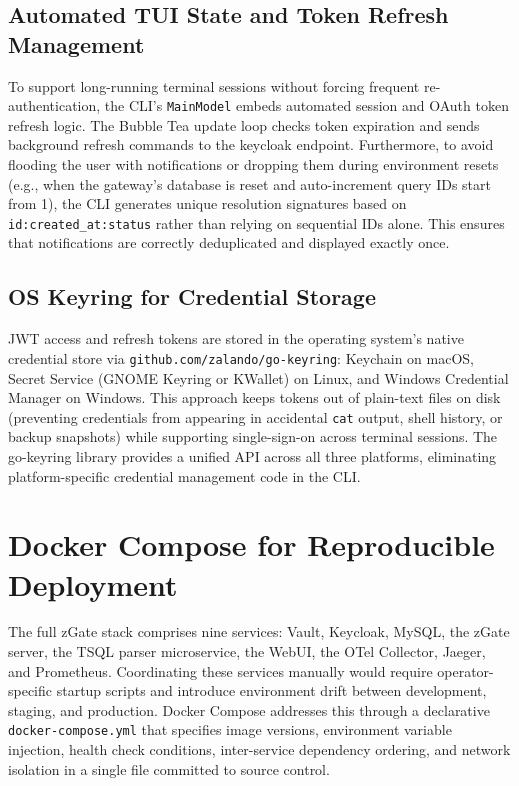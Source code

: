 \subsection{Automated TUI State and Token Refresh Management}

To support long-running terminal sessions without forcing frequent re-authentication, the CLI's \texttt{MainModel} embeds automated session and OAuth token refresh logic. The Bubble Tea update loop checks token expiration and sends background refresh commands to the keycloak endpoint. Furthermore, to avoid flooding the user with notifications or dropping them during environment resets (e.g., when the gateway's database is reset and auto-increment query IDs start from 1), the CLI generates unique resolution signatures based on \texttt{id:created\_at:status} rather than relying on sequential IDs alone. This ensures that notifications are correctly deduplicated and displayed exactly once.

\subsection{OS Keyring for Credential Storage}

JWT access and refresh tokens are stored in the operating system's native credential store via \texttt{github.com/zalando/go-keyring}: Keychain on macOS, Secret Service (GNOME Keyring or KWallet) on Linux, and Windows Credential Manager on Windows. This approach keeps tokens out of plain-text files on disk (preventing credentials from appearing in accidental \texttt{cat} output, shell history, or backup snapshots) while supporting single-sign-on across terminal sessions. The go-keyring library provides a unified API across all three platforms, eliminating platform-specific credential management code in the CLI.

\section{Docker Compose for Reproducible Deployment}
\label{sec:docker}

The full zGate stack comprises nine services: Vault, Keycloak, MySQL, the zGate server, the TSQL parser microservice, the WebUI, the OTel Collector, Jaeger, and Prometheus. Coordinating these services manually would require operator-specific startup scripts and introduce environment drift between development, staging, and production. Docker Compose addresses this through a declarative \texttt{docker-compose.yml} that specifies image versions, environment variable injection, health check conditions, inter-service dependency ordering, and network isolation in a single file committed to source control.

